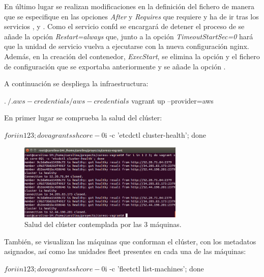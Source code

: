 En último lugar se realizan modificaciones en la definición del fichero  de manera que se especifique en las opciones \textit{After} y \textit{Requires} que requiere y ha de ir tras los servicios ,  y . Como el servicio confd se encargará de detener el proceso de  se añade la opción \textit{Restart=always} que, junto a la opción \textit{TimeoutStartSec=0} hará que la unidad de servicio vuelva a ejecutarse con la nueva configuración nginx. Además, en la creación del contenedor, \textit{ExecStart}, se elimina la opción  y el fichero de configuración que se exportaba anteriormente  y se añade la opción .

A continuación se despliega la infraestructura:

\begin{code}
$ . ~/.aws-credentials/aws-credentials
$ vagrant up --provider=aws
\end{code}

En primer lugar se comprueba la salud del clúster:

\begin{code}
$ for i in 1 2 3; do vagrant ssh core-0$i -c 'etcdctl cluster-health'; done
\end{code}

\begin{figure}[H]
\centering
\includegraphics[width=0.7\textwidth]{images/figures/health-confd.png}
\caption{Salud del clúster contemplada por las 3 máquinas.}
\end{figure}

También, se visualizan las máquinas que conforman el clúster, con los metadatos asignados, así como las unidades fleet presentes en cada una de las máquinas:

\begin{code}
$ for i in 1 2 3; do vagrant ssh core-0$i -c 'fleetctl list-machines'; done
\end{code}

